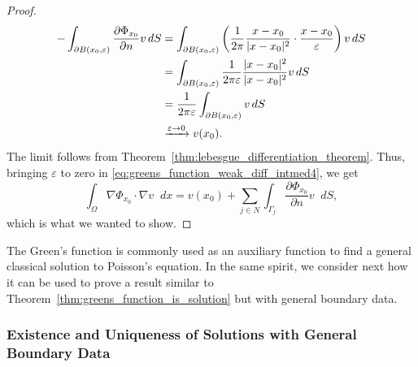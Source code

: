 \documentclass[english, 12pt, a4paper, sci, utf8, a-2b, online]{aaltothesis}
\theoremstyle{definition}
\theoremstyle{plain}
\DeclarePairedDelimiter\abs{\lvert}{\rvert}
\newcommand*\diff{\mathop{}\!d}
\numberwithin{equation}{section}
\begin{document}
\begin{proof}
\begin{align*}
        - \int_{\partial B(x_0,\varepsilon)}
            \frac{\partial \Phi_{x_0}}{\partial n} v \diff S
        &= \int_{\partial B(x_0,\varepsilon)}
            \left(\frac{1}{2\pi} \frac{x-x_0}{\abs{x-x_0}^2} \cdot
                \frac{x-x_0}{\varepsilon} \right) v \diff S \\
        &= \int_{\partial B(x_0,\varepsilon)}
            \frac{1}{2\pi\varepsilon} \frac{\abs{x-x_0}^2}{\abs{x-x_0}^2} v \diff S \\
        &= \frac{1}{2\pi\varepsilon} \int_{\partial B(x_0,\varepsilon)}
            v \diff S \\
        &\xrightarrow[]{\varepsilon \to 0} v(x_0).
    \end{align*}
    The limit follows from Theorem~\ref{thm:lebesgue_differentiation_theorem}.
    Thus, bringing $\varepsilon$ to zero in 
    \eqref{eq:greens_function_weak_diff_intmed4}, we get
    \begin{equation*}
        \int_{\Omega} \nabla \Phi_{x_0} \cdot \nabla v \diff x
        = v(x_0) + \sum_{j \in N} \int_{\Gamma_j}
            \frac{\partial \Phi_{x_0}}{\partial n} v \diff S,
    \end{equation*}
    which is what we wanted to show.
\end{proof}

The Green's function is commonly used as an auxiliary
function to find a general classical solution to Poisson's equation.
In the same spirit, we consider next how it can be used to prove
a result similar to Theorem~\ref{thm:greens_function_is_solution} but
with general boundary data.

\subsubsection{Existence and Uniqueness of Solutions with General Boundary Data}
\label{subsubsec:existence_and_uniqueness_of_solutions_with_arbitrary_data}
\end{document}
